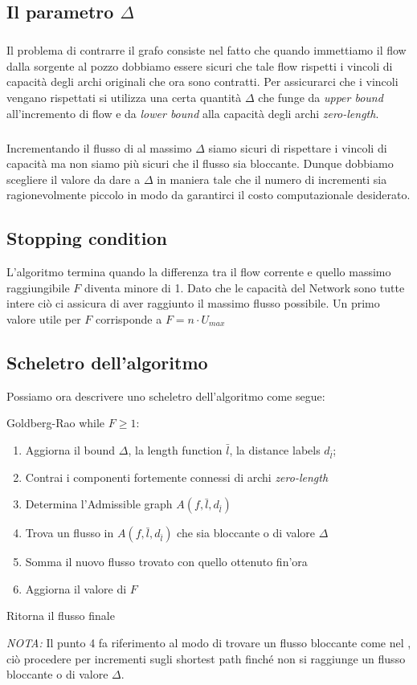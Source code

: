 \documentclass[a4paper, 11pt]{report}
\begin{document}
\subsection{Il parametro $\Delta$}
    \subparagraph{}
    Il problema di contrarre il grafo consiste nel fatto che quando immettiamo il flow dalla sorgente al pozzo dobbiamo essere sicuri che tale flow rispetti i vincoli di capacità degli archi originali che ora sono contratti.
    Per assicurarci che i vincoli vengano rispettati si utilizza una certa quantità $\Delta$ che funge da \textit{upper bound} all'incremento di flow e da \textit{lower bound} alla capacità degli archi \textit{zero-length}. 
    \subparagraph{}
    Incrementando il flusso di al massimo $\Delta$ siamo sicuri di rispettare i vincoli di capacità ma non siamo più sicuri che il flusso sia bloccante.
    Dunque dobbiamo scegliere il valore da dare a $\Delta$ in maniera tale che il numero di incrementi sia ragionevolmente piccolo in modo da garantirci il costo computazionale desiderato.

\subsection{Stopping condition}
    L'algoritmo termina quando la differenza tra il flow corrente e quello massimo raggiungibile $F$ diventa minore di 1.
    Dato che le capacità del Network sono tutte intere ciò ci assicura di aver raggiunto il massimo flusso possibile.
    Un primo valore utile per $F$ corrisponde a $F = n\cdot U_{max}$

\subsection{Scheletro dell'algoritmo}
    Possiamo ora descrivere uno scheletro dell'algoritmo come segue:
    \begin{algo}{Goldberg-Rao}{}
        while $F \ge 1$:\begin{enumerate}
            \item Aggiorna il bound $\Delta$, la length function $\bar{l}$, la distance labels $d_{\bar{l}}$;
            \item Contrai i componenti fortemente connessi di archi \textit{zero-length}
            \item Determina l'Admissible graph $A(f, \bar{l},d_{\bar{l}} )$
            \item Trova un flusso in $A(f, \bar{l},d_{\bar{l}} )$ che sia bloccante o di valore $\Delta$
            \item Somma il nuovo flusso trovato con quello ottenuto fin'ora 
            \item Aggiorna il valore di $F$
        \end{enumerate}
        Ritorna il flusso finale 
    \end{algo}
    \textit{NOTA:} Il punto 4 fa riferimento al modo di trovare un flusso bloccante come nel , ciò procedere per incrementi sugli shortest path finché non si raggiunge un flusso bloccante o di valore $\Delta$.
\end{document}
